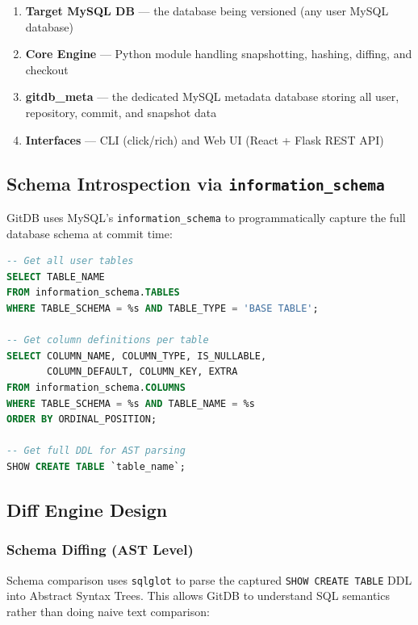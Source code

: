 \documentclass[12pt, a4paper]{article}
\begin{document}
\begin{enumerate}[leftmargin=1.5em, itemsep=0.3em]
    \item \textbf{Target MySQL DB} --- the database being versioned (any user
    MySQL database)
    \item \textbf{Core Engine} --- Python module handling snapshotting, hashing,
    diffing, and checkout
    \item \textbf{gitdb\_meta} --- the dedicated MySQL metadata database storing
    all user, repository, commit, and snapshot data
    \item \textbf{Interfaces} --- CLI (click/rich) and Web UI (React + Flask
    REST API)
\end{enumerate}

\subsection{Schema Introspection via \texttt{information\_schema}}

GitDB uses MySQL's \texttt{information\_schema} to programmatically capture the
full database schema at commit time:

\begin{tcolorbox}[commandbox, title=Schema Capture Queries]
\begin{lstlisting}[language=SQL]
-- Get all user tables
SELECT TABLE_NAME
FROM information_schema.TABLES
WHERE TABLE_SCHEMA = %s AND TABLE_TYPE = 'BASE TABLE';

-- Get column definitions per table
SELECT COLUMN_NAME, COLUMN_TYPE, IS_NULLABLE,
       COLUMN_DEFAULT, COLUMN_KEY, EXTRA
FROM information_schema.COLUMNS
WHERE TABLE_SCHEMA = %s AND TABLE_NAME = %s
ORDER BY ORDINAL_POSITION;

-- Get full DDL for AST parsing
SHOW CREATE TABLE `table_name`;
\end{lstlisting}
\end{tcolorbox}

\subsection{Diff Engine Design}

\subsubsection{Schema Diffing (AST Level)}

Schema comparison uses \texttt{sqlglot} to parse the captured
\texttt{SHOW CREATE TABLE} DDL into Abstract Syntax Trees. This allows GitDB to
understand SQL semantics rather than doing naive text comparison:
\end{document}
